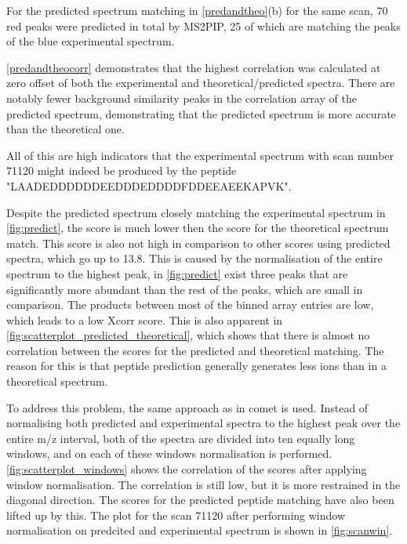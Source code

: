 \documentclass[11pt]{article}
\begin{document}
For the predicted spectrum matching in \cref{predandtheo}(b) for the same scan, 70 red peaks were predicted in total by MS2PIP, 25 of which are matching the peaks of the blue experimental spectrum.

\cref{predandtheocorr} demonstrates that the highest correlation was calculated at zero offset of both the experimental and theoretical/predicted spectra. There are notably fewer background similarity peaks in the correlation array of the predicted spectrum, demonstrating that the predicted spectrum is more accurate than the theoretical one.

All of this are high indicators that the experimental spectrum with scan number 71120 might indeed be produced by the peptide "LAADEDDDDDDEEDDDEDDDDFDDEEAEEKAPVK".

Despite the predicted spectrum closely matching the experimental spectrum in \cref{fig:predict}, the score is much lower then the score for the theoretical spectrum match. This score is also not high in comparison to other scores using predicted spectra, which go up to 13.8. This is caused by the normalisation of the entire spectrum to the highest peak, in \cref{fig:predict} exist three peaks that are significantly more abundant than the rest of the peaks, which are small in comparison. The products between most of the binned array entries are low, which leads to a low Xcorr score. This is also apparent in \cref{fig:scatterplot_predicted_theoretical}, which shows that there is almost no correlation between the scores for the predicted and theoretical matching. The reason for this is that peptide prediction generally generates less ions than in a theoretical spectrum.

To address this problem, the same approach as in comet is used. Instead of normalising both predicted and experimental spectra to the highest peak over the entire m/z interval, both of the spectra are divided into ten equally long windows, and on each of these windows normalisation is performed. \cref{fig:scatterplot_windows} shows the correlation of the scores after applying window normalisation. The correlation is still low, but it is more restrained in the diagonal direction. The scores for the predicted peptide matching have also been lifted up by this. The plot for the scan 71120 after performing window normalisation on predcited and experimental spectrum is shown in \cref{fig:scanwin}.
\end{document}
